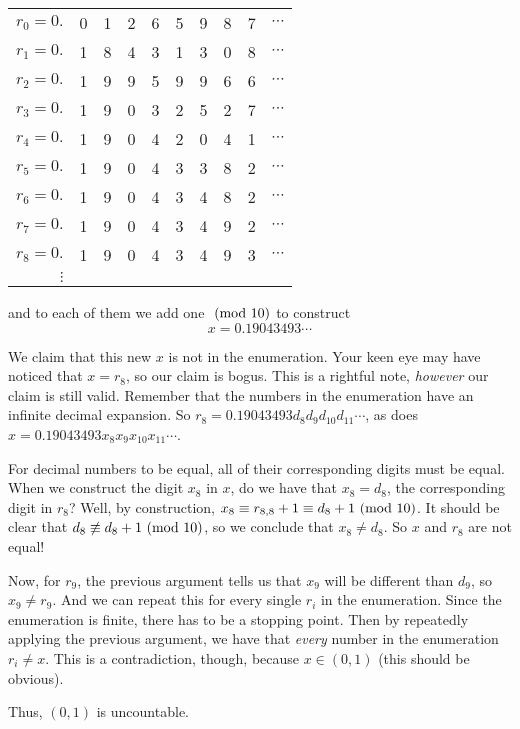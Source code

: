 \documentclass[main.tex]{subfiles}
\begin{document}
{	\begin{center}
		\begin{tabular}{rlllllllll}
			\(r_0 = 0.\) &\cellcolor{Melon}0 & 1 & 2 & 6 & 5 & 9 & 8 & 7 & \(\cdots\) \\
			\(r_1 = 0.\) & 1 &\cellcolor{Melon}8 & 4 & 3 & 1 & 3 & 0 & 8 & \(\cdots\) \\
			\(r_2 = 0.\) & 1 & 9 &\cellcolor{Melon}9 & 5 & 9 & 9 & 6 & 6 & \(\cdots\) \\
			\(r_3 = 0.\) & 1 & 9 & 0 &\cellcolor{Melon}3 & 2 & 5 & 2 & 7 & \(\cdots\) \\
			\(r_4 = 0.\) & 1 & 9 & 0 & 4 &\cellcolor{Melon}2 & 0 & 4 & 1 & \(\cdots\) \\
			\(r_5 = 0.\) & 1 & 9 & 0 & 4 & 3 &\cellcolor{Melon}3 & 8 & 2 & \(\cdots\) \\
			\(r_6 = 0.\) & 1 & 9 & 0 & 4 & 3 & 4 &\cellcolor{Melon}8 & 2 & \(\cdots\) \\
			\(r_7 = 0.\) & 1 & 9 & 0 & 4 & 3 & 4 & 9 &\cellcolor{Melon}2 & \(\cdots\) \\
			\(r_8 = 0.\) & 1 & 9 & 0 & 4 & 3 & 4 & 9 & 3 & \(\cdots\) \\
			\(\vdots\) \\
		\end{tabular}
	\end{center}
	
	and to each of them we add one \(\ (\mathrm{mod}\ 10)\) to construct \[x = 0.19043493\cdots\]
	
	We claim that this new \(x\) is not in the enumeration. Your keen eye may have noticed that \(x = r_8\), so our claim is bogus. This is a rightful note, \textit{however} our claim is still valid. Remember that the numbers in the enumeration have an infinite decimal expansion. So \(r_8 = 0.19043493 d_8 d_9 d_{10} d_{11} \cdots\), as does \(x = 0.19043493 x_8 x_9 x_{10} x_{11} \cdots\).
	
	For decimal numbers to be equal, all of their corresponding digits must be equal. When we construct the digit \(x_8\) in \(x\), do we have that \(x_8 = d_8\), the corresponding digit in \(r_8\)? Well, by construction, \(x_8 \equiv r_{8,8} + 1 \equiv d_8 + 1 \ (\mathrm{mod}\ 10)\). It should be clear that \(d_8 \not\equiv d_8 + 1 \ (\mathrm{mod}\ 10)\), so we conclude that \(x_8 \neq d_8\). So \(x\) and \(r_8\) are not equal!
	
	Now, for \(r_9\), the previous argument tells us that \(x_9\) will be different than \(d_9\), so \(x_9 \neq r_9\). And we can repeat this for every single \(r_i\) in the enumeration. Since the enumeration is finite, there has to be a stopping point. Then by repeatedly applying the previous argument, we have that \textit{every} number in the enumeration \(r_i \neq x\). This is a contradiction, though, because \(x \in (0,1)\) (this should be obvious).
	
	Thus, \((0,1)\) is uncountable.
}
\end{document}
